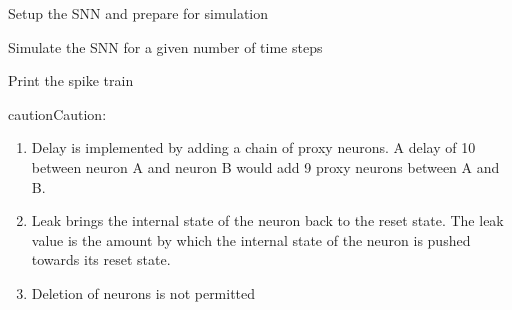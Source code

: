 \documentclass[letterpaper,10pt,english]{sphinxmanual}
\begin{document}
\begin{fulllineitems}

\begin{fulllineitems}
\label{\detokenize{index:superneuromat.SNN.setup}}
\pysigstartsignatures
\pysiglinewithargsret
{}
{}
{}
\pysigstopsignatures
\sphinxAtStartPar
Setup the SNN and prepare for simulation

\end{fulllineitems}


\begin{fulllineitems}
\label{\detokenize{index:superneuromat.SNN.simulate}}
\pysigstartsignatures
\pysiglinewithargsret
{}
{}
{}
\pysigstopsignatures
\sphinxAtStartPar
Simulate the SNN for a given number of time steps

\end{fulllineitems}


\begin{fulllineitems}
\label{\detokenize{index:superneuromat.SNN.print_spike_train}}
\pysigstartsignatures
\pysiglinewithargsret
{}
{}
{}
\pysigstopsignatures
\sphinxAtStartPar
Print the spike train

\end{fulllineitems}


\begin{sphinxadmonition}{caution}{Caution:}\begin{enumerate}
%
\item {} 
\sphinxAtStartPar
Delay is implemented by adding a chain of proxy neurons. A delay of 10 between neuron A and neuron B would add 9 proxy neurons between A and B.

\item {} 
\sphinxAtStartPar
Leak brings the internal state of the neuron back to the reset state. The leak value is the amount by which the internal state of the neuron is pushed towards its reset state.

\item {} 
\sphinxAtStartPar
Deletion of neurons is not permitted


\end{enumerate}
\end{sphinxadmonition}
\end{fulllineitems}
\end{document}
